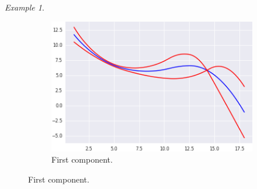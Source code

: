 \documentclass[10pt, a4paper]{report}
\theoremstyle{definition}
\theoremstyle{remark}
\newtheorem{ex}{Example}
\begin{document}
\begin{ex}
\begin{figure}[H]
\begin{subfigure}{.4\textwidth}
		\end{subfigure}%
		\begin{subfigure}{.4\textwidth}
			\centering
			\includegraphics[width=.8\linewidth]{Code/images/14/pca1}
			\caption{\centering First component.}
		\end{subfigure}
		
		
		\medskip
		

\end{figure}
\end{ex}
\end{document}
